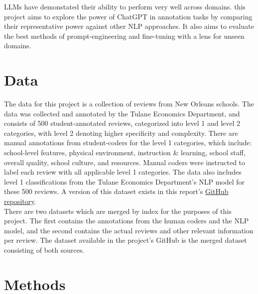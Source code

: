 \documentclass[12pt,a4paper]{article}
\begin{document}
\noindent LLMs have demonstated their ability to perform very well across domains. this project aims to explore the power of ChatGPT in annotation tasks by comparing their representative power against other NLP approaches. It also aims to evaluate the best methods of prompt-engineering and fine-tuning with a lens for unseen domains. \\



\section{Data}\label{sec2}

\noindent The data for this project is a collection of reviews from New Orleans schools. The data was collected and annotated by the Tulane Economics Department, and consists of 500 student-annotated reviews, categorized into level 1 and level 2 categories, with level 2 denoting higher specificity and complexity. There are manual annotations from student-coders for the level 1 categories, which include: school-level features, physical environment, instruction \& learning, school staff, overall quality, school culture, and resources. Manual coders were instructed to label each review with all applicable level 1 categories. The data also includes level 1 classifications from the Tulane Economics Department's NLP model for these 500 reviews. A version of this dataset exists in this report's \href{https://github.com/tulane-cmps6730/project-polititweet}{GitHub repository}.\\

\noindent There are two datasets which are merged by index for the purposes of this project. The first contains the annotations from the human coders and the NLP model, and the second contains the actual reviews and other relevant information per review. The dataset available in the project's GitHub is the merged dataset consisting of both sources. 



\section{Methods}\label{sec3}
\end{document}
